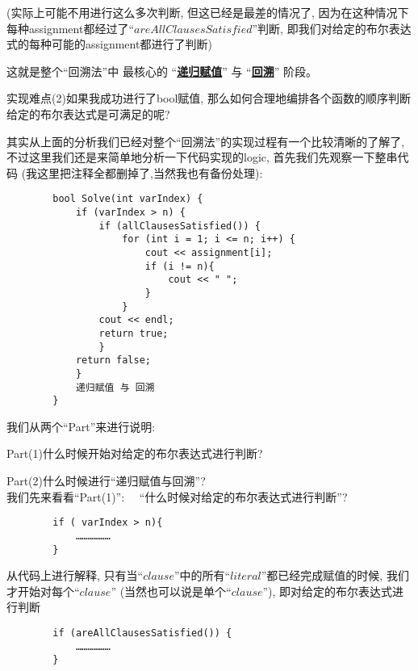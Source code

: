         (实际上可能不用进行这么多次判断,
        但这已经是最差的情况了,
        因为在这种情况下每种assignment都经过了``$areAllClausesSatisfied$''判断,
        即我们对给定的布尔表达式的每种可能的assignment都进行了判断)
        \par
        这就是整个``回溯法''中
        最核心的
        ``\underline{\textbf{递归赋值}}''
        与
        ``\underline{\textbf{回溯}}''
        阶段。
        \newline
        \par
        实现难点(2)如果我成功进行了bool赋值,
        那么如何合理地编排各个函数的顺序判断给定的布尔表达式是可满足的呢?
        \newline
        \par
        其实从上面的分析我们已经对整个``回溯法''的实现过程有一个比较清晰的了解了,
        不过这里我们还是来简单地分析一下代码实现的logic,
        首先我们先观察一下整串代码
        (我这里把注释全都删掉了,当然我也有备份处理):
        \begin{lstlisting}
        bool Solve(int varIndex) {
            if (varIndex > n) {
                if (allClausesSatisfied()) {
                    for (int i = 1; i <= n; i++) {
                        cout << assignment[i];
                        if (i != n){
                            cout << " ";  
                        } 
                    }
                cout << endl;
                return true;
                }
            return false;
            }
            递归赋值 与 回溯
        }
        \end{lstlisting}
        我们从两个``Part''来进行说明:\par
        Part(1)什么时候开始对给定的布尔表达式进行判断?\par
        Part(2)什么时候进行``递归赋值与回溯''?\\
        我们先来看看``Part(1)'':
        $\quad$``什么时候对给定的布尔表达式进行判断''?
        \begin{lstlisting}
        if ( varIndex > n){
            ………………
        }
        \end{lstlisting}
        \par
        从代码上进行解释,
        只有当``$clause$''中的所有``$literal$''都已经完成赋值的时候,
        我们才开始对每个``$clause$''
        (当然也可以说是单个``$clause$''),
        即对给定的布尔表达式进行判断\par
        \begin{lstlisting}
        if (areAllClausesSatisfied()) {
            ………………
        }
        \end{lstlisting}

